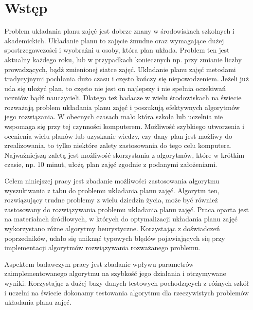 \chapter{Wstęp}


Problem układania planu zajęć jest dobrze znany w środowiskach szkolnych i akademickich. Układanie planu to zajęcie żmudne oraz wymagające dużej spostrzegawczości i wyobraźni u osoby, która plan układa. Problem ten jest aktualny każdego roku, lub w przypadkach koniecznych np. przy zmianie liczby prowadzących, bądź zmienionej siatce zajęć. Układanie planu zajęć metodami tradycyjnymi pochłania dużo czasu i często kończy się niepowodzeniem. Jeżeli już uda się ułożyć plan, to często nie jest on najlepszy i nie spełnia oczekiwań uczniów bądź nauczycieli. Dlatego też badacze w wielu środowiskach na świecie rozważają problem układania planu zajęć i poszukują efektywnych algorytmów jego rozwiązania. W obecnych czasach mało która szkoła lub uczelnia nie wspomaga się przy tej czynności komputerem. Możliwość szybkiego utworzenia i ocenienia wielu planów lub uzyskanie wiedzy, czy dany plan jest możliwy do zrealizowania, to tylko niektóre zalety zastosowania do tego celu komputera. Najważniejszą zaletą jest możliwość skorzystania z algorytmów, które w krótkim czasie, np. 10 minut, ułożą plan zajęć zgodnie z podanymi założeniami.

Celem niniejszej pracy jest zbadanie możliwości zastosowania algorytmu wyszukiwania z tabu do problemu układania planu zajęć. Algorytm ten, rozwiązujący trudne problemy z wielu dziedzin życia, może być również zastosowany do rozwiązywania problemu układania planu zajęć. Praca oparta jest na materiałach źródłowych, w których do optymalizacji układania planu zajęć wykorzystano różne algorytmy heurystyczne. Korzystając z doświadczeń poprzedników, udało się uniknąć typowych błędów pojawiających się przy implementacji algorytmów rozwiązywania rozważanego problemu.

Aspektem badawczym pracy jest zbadanie wpływu parametrów zaimplementowanego algorytmu na szybkość jego działania i otrzymywane wyniki. Korzystając z dużej bazy danych testowych pochodzących z różnych szkół i uczelni na świecie dokonamy testowania algorytmu dla rzeczywistych problemów układania planu zajęć.

